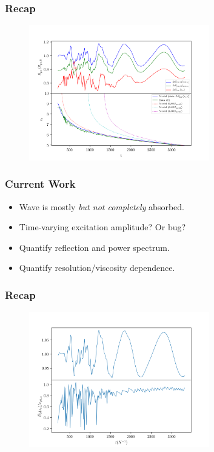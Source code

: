 \documentclass[dvipsnames, 10pt]{beamer}
\begin{document}
\begin{frame}
    \frametitle{Recap}

    \begin{figure}[t]
        \centering
        \includegraphics[width=0.7\textwidth]{front.png}
    \end{figure}
\end{frame}

\begin{frame}
    \frametitle{Current Work}

    \begin{itemize}
        \item Wave is mostly \emph{but not completely} absorbed.

        \item Time-varying excitation amplitude? Or bug?

        \item Quantify reflection and power spectrum.

        \item Quantify resolution/viscosity dependence.
    \end{itemize}
\end{frame}

\begin{frame}
    \frametitle{Recap}

    \begin{figure}[t]
        \centering
        \includegraphics[width=0.7\textwidth]{f_amps.png}
    \end{figure}
\end{frame}
\end{document}
